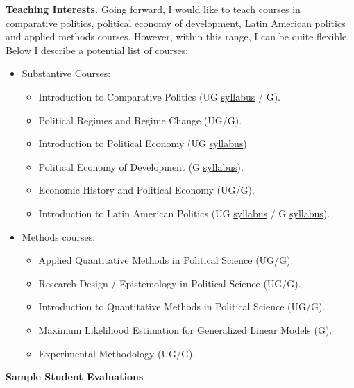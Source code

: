 \documentclass[11pt]{letter} %
\begin{document}
\begin{letter}{}
{\bf Teaching Interests.} Going forward, I would like to teach courses in comparative politics, political economy of development, Latin American politics and applied methods courses. However, within this range, I can be quite flexible. Below I describe a potential list of courses:

\begin{itemize}
\item Substantive Courses:
	\begin{itemize}
	\item Introduction to Comparative Politics (UG \href{https://github.com/hbahamonde/Comparative_Politics_UGRAD/raw/master/Bahamonde_Comparative_Politics_Syllabus_UGRAD.pdf}{syllabus} / G).
	\item Political Regimes and Regime Change (UG/G).
	\item Introduction to Political Economy (UG \href{https://github.com/hbahamonde/Political-Economy-Intro-UGrad/raw/master/Pol_Econ_Dev_Syllabus_UGRAD.pdf}{syllabus})
	\item Political Economy of Development (G \href{https://github.com/hbahamonde/Pol_Econ_Dev_Grad/raw/master/Pol_Econ_Dev_Syllabus_GRAD.pdf}{syllabus}).
	\item Economic History and Political Economy (UG/G).
	\item Introduction to Latin American Politics (UG \href{https://github.com/hbahamonde/Latin_American_Politics_UGRAD/raw/master/Bahamonde_Latin_American_Politics_Syllabus_UGRAD.pdf}{syllabus} / G \href{https://github.com/hbahamonde/Latin_American_Politics_GRAD/raw/master/Bahamonde_Latin_American_Politics_Syllabus_GRAD.pdf}{syllabus}).
	\end{itemize}
\item Methods courses:
	\begin{itemize}
	\item Applied Quantitative Methods in Political Science (UG/G).
	\item Research Design / Epistemology in Political Science (UG/G).
	\item Introduction to Quantitative Methods in Political Science (UG/G).
	\item Maximum Likelihood Estimation for Generalized Linear Models (G).
	\item Experimental Methodology (UG/G).
	\end{itemize}
\end{itemize}


{\bf Sample Student Evaluations}


\end{letter}
\end{document}
